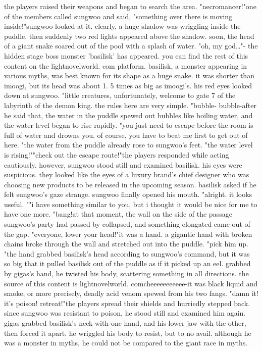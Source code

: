 the players raised their weapons and began to search the area.
"necromancer!"one of the members called sungwoo and said, "something over there is moving inside!"sungwoo looked at it.
 clearly, a huge shadow was wriggling inside the puddle.
then suddenly two red lights appeared above the shadow.
soon, the head of a giant snake soared out of the pool with a splash of water.
"oh, my god…"- the hidden stage boss monster 'basilisk' has appeared.
you can find the rest of this content on the lightnovelworld.
com platform.
basilisk, a monster appearing in various myths, was best known for its shape as a huge snake.
it was shorter than imoogi, but its head was about 1.
5 times as big as imoogi's.
his red eyes looked down at sungwoo.
"little creatures, unfortunately, welcome to gate 7 of the labyrinth of the demon king.
 the rules here are very simple.
"bubble- bubble-after he said that, the water in the puddle spewed out bubbles like boiling water, and the water level began to rise rapidly.
"you just need to escape before the room is full of water and drowns you.
 of course, you have to beat me first to get out of here.
"the water from the puddle already rose to sungwoo's feet.
"the water level is rising!""check out the escape route!"the players responded while acting cautiously.
however, sungwoo stood still and examined basilisk.
 his eyes were suspicious.
 they looked like the eyes of a luxury brand's chief designer who was choosing new products to be released in the upcoming season.
 basilisk asked if he felt sungwoo's gaze strange.
sungwoo finally opened his mouth.
"alright.
 it looks useful.
""i have something similar to you, but i thought it would be nice for me to have one more.
"bang!at that moment, the wall on the side of the passage sungwoo's party had passed by collapsed, and something elongated came out of the gap.
"everyone, lower your head!"it was a hand.
 a gigantic hand with broken chains broke through the wall and stretched out into the puddle.
"pick him up.
"the hand grabbed basilisk's head according to sungwoo's command, but it was so big that it pulled basilisk out of the puddle as if it picked up an eel.
grabbed by gigas's hand, he twisted his body, scattering something in all directions.
the source of this content is lightnov­elworld.
comcheeeeeeeeeee-it was black liquid and smoke, or more precisely, deadly acid venom spewed from his two fangs.
"damn it! it's poison! retreat!"the players spread their shields and hurriedly stepped back.
since sungwoo was resistant to poison, he stood still and examined him again.
gigas grabbed basilisk's neck with one hand, and his lower jaw with the other, then forced it apart.
he wriggled his body to resist, but to no avail.
 although he was a monster in myths, he could not be compared to the giant race in myths.



